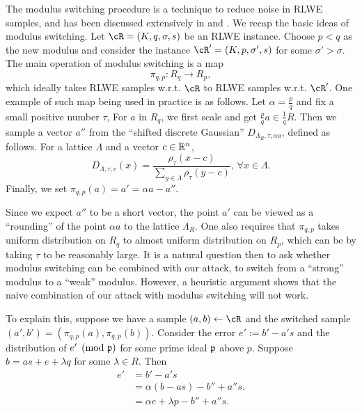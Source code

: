 \documentclass[envcountsect]{llncs}
\begin{document}
The modulus switching procedure is a technique to reduce noise
in RLWE samples, and has been discussed extensively in  \cite{brakerski2012leveled} and \cite{langlois2014worst}.
We recap the basic ideas of modulus switching. Let $\cR = (K, q, \sigma, s)$ be an RLWE instance. Choose $p < q$ as the new modulus and consider the instance $\cR' = (K,p,\sigma',s)$ for some $\sigma' > \sigma$. The main operation of modulus switching is a map
\[
\pi_{q,p} : R_q \to R_p,
\]
which ideally takes RLWE samples w.r.t. $\cR$ to RLWE samples w.r.t. $\cR'$. One example of such map being used in practice is as follows. Let $\alpha = \frac{p}{q}$ and fix a small positive number $\tau$, For $a$ in $R_q$, we first scale and get $\frac{p}{q}a \in \frac{1}{q} R$. Then we sample a vector $a''$ from the ``shifted discrete Gaussian'' $D_{\Lambda_R, \tau, \alpha a}$,  defined as follows. For a lattice $\Lambda$ and a vector $c \in \mathbb{R}^n$,
\[
    D_{\Lambda, \tau, c}(x) = \frac{\rho_\tau(x - c)}{\sum_{y \in\Lambda} \rho_\tau(y-c)}, \, \forall x \in \Lambda.
\]
Finally, we set $ \pi_{q,p}(a) = a' = \alpha a - a''$. 

Since we expect $a''$ to be a  short vector, the point $a'$ can be viewed as a ``rounding'' of the point $\alpha a$ to the lattice $\Lambda_R$. One also requires that $\pi_{q,p}$ takes uniform distribution on $R_q$ to almost uniform distribution on $R_p$, which can be by taking $\tau$ to be reasonably large. It is a natural question then to ask whether modulus switching can be combined with our attack, to switch from a ``strong'' modulus to a ``weak'' modulus. However, a heuristic argument shows that the naive combination of our attack with modulus switching will not work.

To explain this, suppose we have a sample $(a,b) \gets \cR$ and the switched sample $(a', b') = (\pi_{q,p}(a),\pi_{q,p}(b))$. Consider the error $e':= b' - a's$ and the distribution of $e' \pmod{\mathfrak{p}}$ for some prime ideal $\mathfrak{p}$ above $p$. Suppose $b = as+e+ \lambda q$ for some $\lambda \in R$. Then
\begin{align*}
    e' &= b' - a's  \\
    &= \alpha(b-as) - b''  + a''s. \\
    & = \alpha e + \lambda p - b'' + a''s.
\end{align*}
\end{document}
